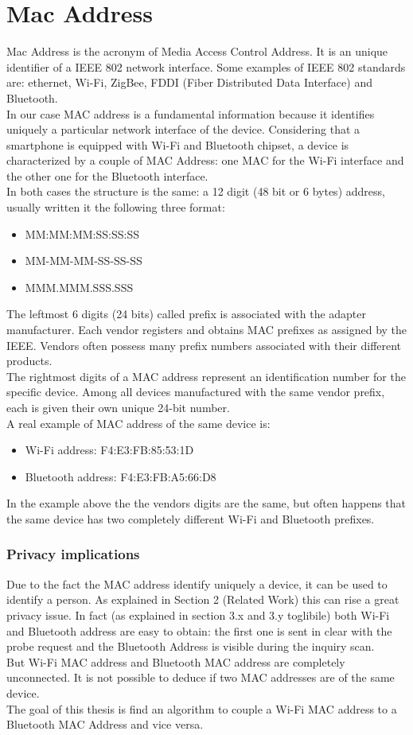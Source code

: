 \section{Mac Address}
Mac Address is the acronym of Media Access Control Address. It is an unique identifier of a IEEE 802 network interface. Some examples of IEEE 802 standards are: ethernet, Wi-Fi, ZigBee, FDDI (Fiber Distributed Data Interface) and Bluetooth. \\
In our case MAC address is a fundamental information because it identifies uniquely a particular network interface of the device. Considering that a smartphone is equipped with Wi-Fi and Bluetooth chipset, a device is characterized by a couple of MAC Address: one MAC for the Wi-Fi interface and the other one for the Bluetooth interface.\\
In both cases the structure is the same: a 12 digit (48 bit or 6 bytes) address, usually written it the following three format: 
\begin{itemize}
\item MM:MM:MM:SS:SS:SS
\item MM-MM-MM-SS-SS-SS
\item MMM.MMM.SSS.SSS
\end{itemize}
The leftmost 6 digits (24 bits) called prefix is associated with the adapter manufacturer. Each vendor registers and obtains MAC prefixes as assigned by the IEEE. Vendors often possess many prefix numbers associated with their different products.\\
The rightmost digits of a MAC address represent an identification number for the specific device. Among all devices manufactured with the same vendor prefix, each is given their own unique 24-bit number.\\
A real example of MAC address of the same device is:
\begin{itemize}
\item Wi-Fi address: F4:E3:FB:85:53:1D
\item Bluetooth address: F4:E3:FB:A5:66:D8
\end{itemize}
In the example above the the vendors digits are the same, but often happens that the same device has two completely different Wi-Fi and Bluetooth prefixes.

\subsubsection{Privacy implications}
Due to the fact the MAC address identify uniquely a device, it can be used to identify a person. As explained in Section 2 (Related Work) this can rise a great privacy issue. In fact (as explained in section 3.x and 3.y toglibile) both Wi-Fi and Bluetooth address are easy to obtain: the first one is sent in clear with the probe request and the Bluetooth Address is visible during the inquiry scan.\\
But Wi-Fi MAC address and Bluetooth MAC address are completely unconnected. It is not possible to deduce if two MAC addresses are of the same device.\\
The goal of this thesis is find an algorithm to couple a Wi-Fi MAC address to a Bluetooth MAC Address and vice versa.
